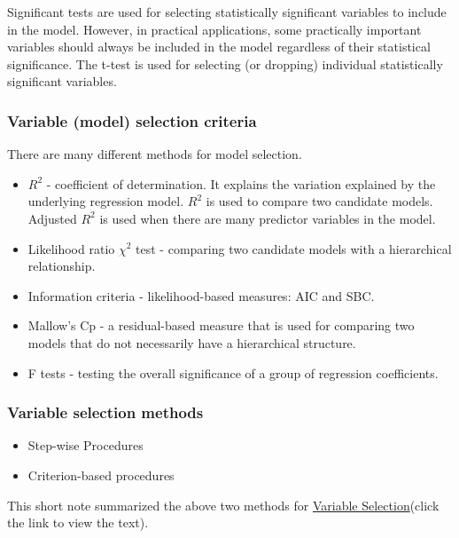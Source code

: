 \documentclass[
]{book}
\begin{document}
Significant tests are used for selecting statistically significant variables to include in the model. However, in practical applications, some practically important variables should always be included in the model regardless of their statistical significance. The t-test is used for selecting (or dropping) individual statistically significant variables.

\hypertarget{variable-model-selection-criteria}{%
\subsubsection{Variable (model) selection criteria}\label{variable-model-selection-criteria}}

There are many different methods for model selection.

\begin{itemize}
\item
  \(R^2\) - coefficient of determination. It explains the variation explained by the underlying regression model. \(R^2\) is used to compare two candidate models. Adjusted \(R^2\) is used when there are many predictor variables in the model.
\item
  Likelihood ratio \(\chi^2\) test - comparing two candidate models with a hierarchical relationship.
\item
  Information criteria - likelihood-based measures: AIC and SBC.
\item
  Mallow's Cp - a residual-based measure that is used for comparing two models that do not necessarily have a hierarchical structure.
\item
  F tests - testing the overall significance of a group of regression coefficients.
\end{itemize}

\hypertarget{variable-selection-methods}{%
\subsubsection{Variable selection methods}\label{variable-selection-methods}}

\begin{itemize}
\item
  Step-wise Procedures
\item
  Criterion-based procedures
\end{itemize}

This short note summarized the above two methods for \href{http://www.biostat.jhsph.edu/~iruczins/teaching/jf/ch10.pdf}{Variable Selection}(click the link to view the text).
\end{document}
